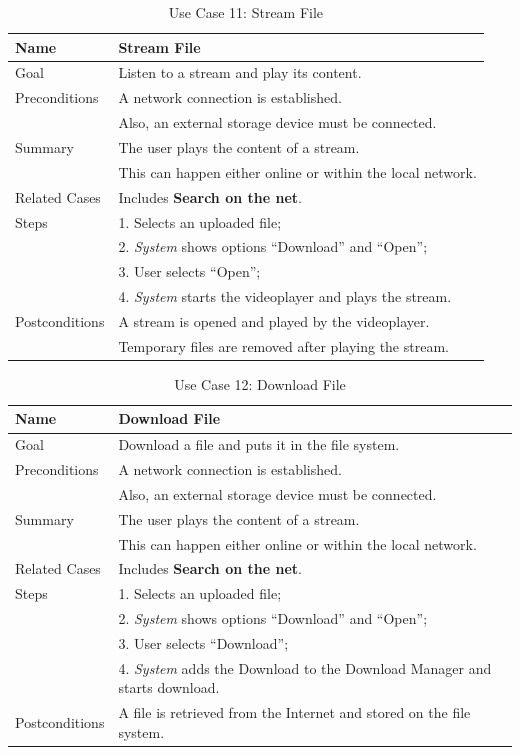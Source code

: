 \begin{table}[h!]
\centering
\begin{tabular}{|l|l|}
\hline
Name & Stream File\\ \hline
Goal & Listen to a stream and play its content.\\ \hline
Preconditions & A network connection is established. \\
& Also, an external storage device must be connected. \\ \hline
Summary & The user plays the content of a stream. \\
& This can happen either online or within the local network.\\ \hline

Related Cases & Includes \textbf{Search on the net}. \\ \hline
Steps &  1. Selects an uploaded file; \\
      &  2. \textit{System} shows options ``Download'' and ``Open''; \\
      &  3. User selects ``Open''; \\
      &  4. \textit{System} starts the videoplayer and plays the stream.
        \\ \hline
Postconditions & A stream is opened and played by the videoplayer. \\
& Temporary files are removed after playing the stream.
\\ \hline
\end{tabular}
\caption{Use Case 11: Stream File}
\label{tab:UC11}
\end{table}

\begin{table}[h!]
\centering
\begin{tabular}{|l|l|}
\hline
Name & Download File\\ \hline
Goal & Download a file and puts it in the file system.\\ \hline
Preconditions & A network connection is established. \\
& Also, an external storage device must be connected. \\ \hline
Summary & The user plays the content of a stream. \\
& This can happen either online or within the local network.\\ \hline

Related Cases & Includes \textbf{Search on the net}. \\ \hline
Steps &  1. Selects an uploaded file; \\
      &  2. \textit{System} shows options ``Download'' and ``Open''; \\
      &  3. User selects ``Download''; \\
      &  4. \textit{System} adds the Download to the Download Manager and starts download.
        \\ \hline
Postconditions & A file is retrieved from the Internet and stored on the file system.
\\ \hline
\end{tabular}
\caption{Use Case 12: Download File}
\label{tab:UC12}
\end{table}

